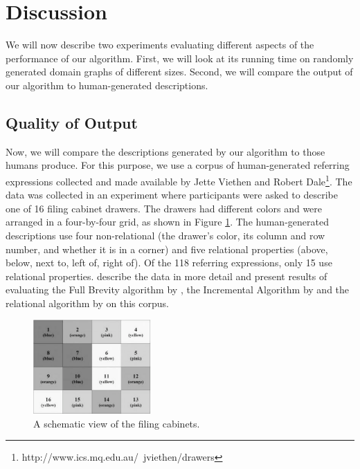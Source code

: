 \section{Discussion} \label{sec:discussion}




We will now describe two experiments evaluating different aspects of
the performance of our algorithm. First, we will look at its running
time on randomly generated domain graphs of different sizes. Second,
we will compare the output of our algorithm to human-generated
descriptions.



\subsection{Quality of Output}

Now, we will compare the descriptions generated by our algorithm to
those humans produce. For this purpose, we use a corpus of
human-generated referring expressions collected and made available by
Jette Viethen and Robert
Dale\footnote{http://www.ics.mq.edu.au/~jviethen/drawers}.  The data
was collected in an experiment where participants were asked to
describe one of 16 filing cabinet drawers. The drawers had different
colors and were arranged in a four-by-four grid, as shown in Figure
\ref{fig:drawers}. The human-generated descriptions use four
non-relational (the drawer's \textsf{color}, its \textsf{column} and
\textsf{row} number, and whether it is in a \textsf{corner}) and five
relational properties (\textsf{above, below, next to, left of, right
of}). Of the 118 referring expressions, only 15 use relational properties.
\cite{viethen06:_algor_for_gener_refer_expres}
describe the data in more detail and present results of evaluating the
Full Brevity algorithm by \cite{}, the Incremental Algorithm by
\cite{} and the relational algorithm by \cite{} on this corpus.

\begin{figure}
\includegraphics[width=0.4\textwidth]{drawers}
\caption{A schematic view of the filing cabinets.}\label{fig:drawers}
\end{figure}


